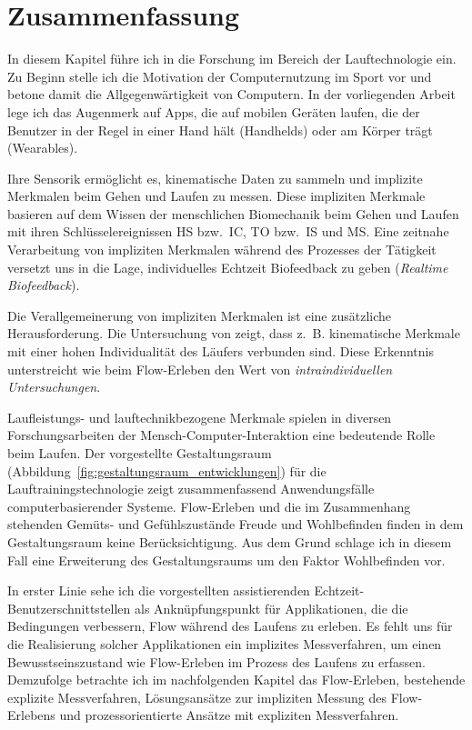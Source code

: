 

\section{Zusammenfassung} 

\label{sec:zusammenfassung_2}

In diesem Kapitel führe ich in die Forschung im Bereich der Lauftechnologie ein. Zu Beginn stelle ich die Motivation der Computernutzung im Sport vor und betone damit die Allgegenwärtigkeit von Computern. In der vorliegenden Arbeit lege ich das Augenmerk auf Apps, die auf mobilen Geräten laufen, die der Benutzer in der Regel in einer Hand hält (Handhelds) oder am Körper trägt (Wearables).

Ihre Sensorik ermöglicht es, kinematische Daten zu sammeln und implizite Merkmalen beim Gehen und Laufen zu messen. Diese impliziten Merkmale basieren auf dem Wissen der menschlichen Biomechanik beim Gehen und Laufen mit ihren Schlüsselereignissen \ac{HS} bzw.\ \ac{IC}, \ac{TO} bzw.\ \ac{IS} und \ac{MS}. Eine zeitnahe Verarbeitung von impliziten Merkmalen während des Prozesses der Tätigkeit versetzt uns in die Lage, individuelles Echtzeit Biofeedback zu geben (\emph{Realtime Biofeedback}). 

Die Verallgemeinerung von impliziten Merkmalen ist eine zusätzliche Herausforderung. Die Untersuchung von \citet{Strohrmann2012} zeigt, dass z.~B. kinematische Merkmale mit einer hohen Individualität des Läufers verbunden sind. Diese Erkenntnis unterstreicht wie beim Flow-Erleben den Wert von \emph{intraindividuellen Untersuchungen}.

Laufleistungs- und lauftechnikbezogene Merkmale spielen in diversen Forschungsarbeiten der Mensch-Computer-Interaktion eine bedeutende Rolle beim Laufen. Der vorgestellte Gestaltungsraum (Abbildung~\ref{fig:gestaltungsraum_entwicklungen}) für die Lauftrainingstechnologie zeigt zusammenfassend Anwendungsfälle computerbasierender Systeme. Flow-Erleben und die im Zusammenhang stehenden Gemüts- und Gefühlszustände Freude und Wohlbefinden finden in dem Gestaltungsraum keine Berücksichtigung. Aus dem Grund schlage ich in diesem Fall eine Erweiterung des Gestaltungsraums um den Faktor Wohlbefinden vor.

In erster Linie sehe ich die vorgestellten assistierenden Echtzeit-Benutzerschnittstellen als Anknüpfungspunkt für Applikationen, die die Bedingungen verbessern, Flow während des Laufens zu erleben. Es fehlt uns für die Realisierung solcher Applikationen ein implizites Messverfahren, um einen Bewusstseinszustand wie Flow-Erleben im Prozess des Laufens zu erfassen. Demzufolge betrachte ich im nachfolgenden Kapitel das Flow-Erleben, bestehende explizite Messverfahren, Lösungsansätze zur impliziten Messung des Flow-Erlebens und prozessorientierte Ansätze mit expliziten Messverfahren.

